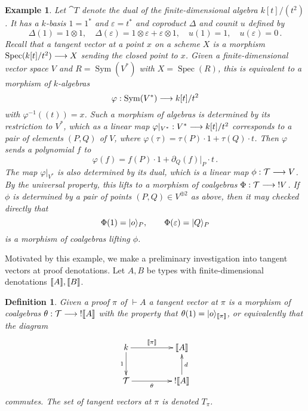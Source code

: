 \documentclass[english,letter paper,12pt,reqno]{article}
\DeclarePairedDelimiter\ket{\lvert}{\rangle}
\theoremstyle{example}
\newtheorem{definition}[theorem]{Definition}
\newtheorem{example}[theorem]{Example}
\numberwithin{equation}{section}
\DeclareMathOperator{\Spec}{Spec}
\DeclareMathOperator{\Sym}{Sym}
\begin{document}
\begin{example}\label{example:tangent_coalgebra} Let $\cat{T}$ denote the dual of the finite-dimensional algebra $k[t]/(t^2)$. It has a $k$-basis $1 = 1^*$ and $\varepsilon = t^*$ and coproduct $\Delta$ and counit $u$ defined by
\[
\Delta(1) = 1 \otimes 1, \quad \Delta( \varepsilon ) = 1 \otimes \varepsilon + \varepsilon \otimes 1, \quad u(1) = 1, \quad u(\varepsilon) = 0\,.
\]
Recall that a tangent vector at a point $x$ on a scheme $X$ is a morphism $\Spec(k[t]/t^2) \lto X$ sending the closed point to $x$. Given a finite-dimensional vector space $V$ and $R = \Sym(V^*)$ with $X = \Spec(R)$, this is equivalent to a morphism of $k$-algebras
\[
\varphi: \Sym(V^*) \lto k[t]/t^2
\]
with $\varphi^{-1}( (t) ) = x$. Such a morphism of algebras is determined by its restriction to $V^*$, which as a linear map $\varphi|_{V^*}: V^* \longrightarrow k[t]/t^2$ corresponds to a pair of elements $(P, Q)$ of $V$, where $\varphi( \tau ) = \tau(P) \cdot 1 + \tau(Q) \cdot t$. Then $\varphi$ sends a polynomial $f$ to
\[
\varphi(f) = f(P) \cdot 1 + \partial_Q( f )|_P \cdot t\,.
\]
The map $\varphi|_{V^*}$ is also determined by its dual, which is a linear map $\phi: \mathcal{T} \longrightarrow V$. By the universal property, this lifts to a morphism of coalgebras $\Phi: \mathcal{T} \longrightarrow {!}V$. If $\phi$ is determined by a pair of points $(P,Q) \in V^{\oplus 2}$ as above, then it may checked directly that
\[
\Phi( 1 ) = \ket{o}_P, \qquad \Phi( \varepsilon ) = \ket{ Q }_P
\]
is a morphism of coalgebras lifting $\phi$.
\end{example}

Motivated by this example, we make a preliminary investigation into tangent vectors at proof denotations. Let $A,B$ be types with finite-dimensional denotations $\llbracket A \rrbracket, \llbracket B \rrbracket$.

\begin{definition} Given a proof $\pi$ of $\vdash A$ a \emph{tangent vector} at $\pi$ is a morphism of coalgebras $\theta: \mathcal{T} \longrightarrow {!} \llbracket A \rrbracket$ with the property that $\theta(1) = \ket{o}_{\den{\pi}}$, or equivalently that the diagram
\begin{equation}
\xymatrix@C+2pc{
k \ar[d]_-{1} \ar[r]^-{\den{\pi}} & \den{A}\\
\cat{T} \ar[r]_-{\theta} & {!} \den{A} \ar[u]_-{d}
}
\end{equation}
commutes. The set of tangent vectors at $\pi$ is denoted $T_{\pi}$.
\end{definition}
\end{document}
